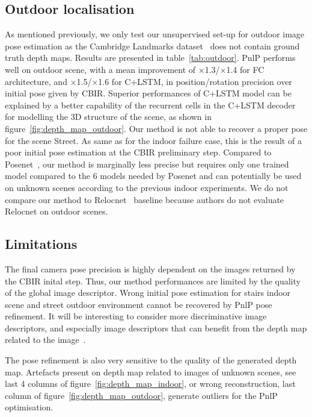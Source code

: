 

\subsection{Outdoor localisation}
\label{subseq:outdoor}



As mentioned previously, we only test our unsupervised set-up for outdoor image pose estimation as the Cambridge Landmarks dataset~\citep{Kendall2015} does not contain ground truth depth maps. Results are presented in table~\ref{tab:outdoor}. PnlP performs well on outdoor scene, with a mean improvement of $\times$1.3/$\times$1.4 for FC architecture, and $\times$1.5/$\times$1.6 for C+LSTM, in position/rotation precision over initial pose given by CBIR. Superior performances of C+LSTM model can be explained by a better capability of the recurrent cells in the C+LSTM decoder for modelling the 3D structure of the scene, as shown in figure~\ref{fig:depth_map_outdoor}. Our method is not able to recover a proper pose for the scene Street. As same as for the indoor failure case, this is the result of a poor initial pose estimation at the CBIR preliminary step. Compared to Posenet~\citep{Kendall2017}, our method is marginally less precise but requires only one trained model compared to the 6 models needed by Posenet and can potentially be used on unknown scenes according to the previous indoor experiments. We do not compare our method to Relocnet~\citep{Purkait2018} baseline because authors do not evaluate Relocnet on outdoor scenes.





\subsection{Limitations}
The final camera pose precision is highly dependent on the images returned by the CBIR inital step. Thus, our method performances are limited by the quality of the global image descriptor. Wrong initial pose estimation for stairs indoor scene and street outdoor environment cannot be recovered by PnlP pose refinement. It will be interesting to consider more discriminative image descriptors, and especially image descriptors that can benefit from the depth map related to the image~\citep{Piasco2019}.

The pose refinement is also very sensitive to the quality of the generated depth map. Artefacts present on depth map related to images of unknown scenes, see last 4 columns of figure~\ref{fig:depth_map_indoor}, or wrong reconstruction, last column of figure~\ref{fig:depth_map_outdoor}, generate outliers for the PnlP optimisation. 

